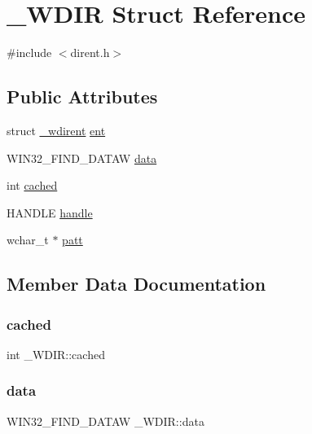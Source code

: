 \hypertarget{struct___w_d_i_r}{}\section{\+\_\+\+W\+D\+IR Struct Reference}
\label{struct___w_d_i_r}


{\ttfamily \#include $<$dirent.\+h$>$}

\subsection*{Public Attributes}
\begin{DoxyCompactItemize}
\item 
struct \mbox{\hyperlink{struct__wdirent}{\+\_\+wdirent}} \mbox{\hyperlink{struct___w_d_i_r_a84ae1457352005f813ed4b3dc1994b62}{ent}}
\item 
W\+I\+N32\+\_\+\+F\+I\+N\+D\+\_\+\+D\+A\+T\+AW \mbox{\hyperlink{struct___w_d_i_r_a065b17b666ee06c4e8068d8accb0eef9}{data}}
\item 
int \mbox{\hyperlink{struct___w_d_i_r_a9b7432df163d1e291ba5925347fd4af3}{cached}}
\item 
H\+A\+N\+D\+LE \mbox{\hyperlink{struct___w_d_i_r_a694510e166fd3e797b3e15b9e4b3810a}{handle}}
\item 
wchar\+\_\+t $\ast$ \mbox{\hyperlink{struct___w_d_i_r_a700ff3a1096fb36452c571b0f55b4e60}{patt}}
\end{DoxyCompactItemize}


\subsection{Member Data Documentation}
\mbox{\label{struct___w_d_i_r_a9b7432df163d1e291ba5925347fd4af3}} 
\subsubsection{\texorpdfstring{cached}{cached}}
{\footnotesize\ttfamily int \+\_\+\+W\+D\+I\+R\+::cached}

\mbox{\label{struct___w_d_i_r_a065b17b666ee06c4e8068d8accb0eef9}} 
\subsubsection{\texorpdfstring{data}{data}}
{\footnotesize\ttfamily W\+I\+N32\+\_\+\+F\+I\+N\+D\+\_\+\+D\+A\+T\+AW \+\_\+\+W\+D\+I\+R\+::data}

